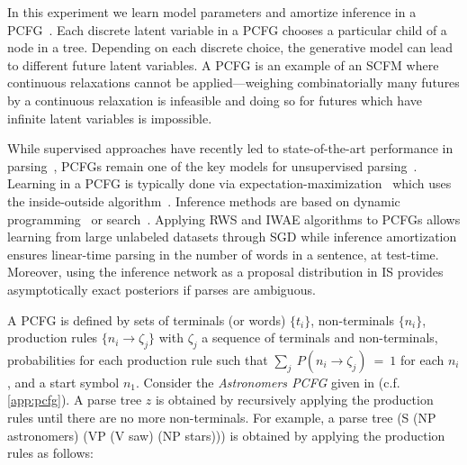 In this experiment we learn model parameters and amortize inference in a \gls{PCFG}~\citep{booth1973applying}.
Each discrete latent variable in a \gls{PCFG} chooses a particular child of a node in a tree.
Depending on each discrete choice, the generative model can lead to different future latent variables.
A \gls{PCFG} is an example of an \gls{SCFM} where continuous relaxations cannot be applied---weighing combinatorially many futures by a continuous relaxation is infeasible and doing so for futures which have infinite latent variables is impossible.

While supervised approaches have recently led to state-of-the-art performance in parsing~\citep{chen2014fast}, \glspl{PCFG} remain one of the key models for unsupervised parsing~\citep{manning1999foundations}.
Learning in a \gls{PCFG} is typically done via expectation-maximization~\citep{dempster1977maximum} which uses the inside-outside algorithm~\citep{lari1990estimation}.
Inference methods are based on dynamic programming~\citep{younger1967recognition,earley1970efficient} or search~\citep{klein2003parsing}.
Applying \gls{RWS} and \gls{IWAE} algorithms to \glspl{PCFG} allows learning from large unlabeled datasets through \gls{SGD} while inference amortization ensures linear-time parsing in the number of words in a sentence, at test-time.
Moreover, using the inference network as a proposal distribution in \gls{IS} provides asymptotically exact posteriors if parses are ambiguous.

A \gls{PCFG} is defined by sets of terminals (or words) $\{t_i\}$, non-terminals $\{n_i\}$, production rules $\{n_i \to \zeta_j\}$ with $\zeta_j$ a sequence of terminals and non-terminals, probabilities for each production rule such that $\sum_j~P\left(n_i \!\to\! \zeta_j\right)~=~1$ for each $n_i$, and a start symbol $n_1$.
Consider the \emph{Astronomers \gls{PCFG}} given in \citet[Table
11.2]{manning1999foundations} (c.f. \cref{app:pcfg}).
A parse tree $z$ is obtained by recursively applying the production rules until there are no more non-terminals.
For example, a parse tree (S (NP astronomers) (VP (V saw) (NP stars))) is obtained by applying the production rules as follows:

